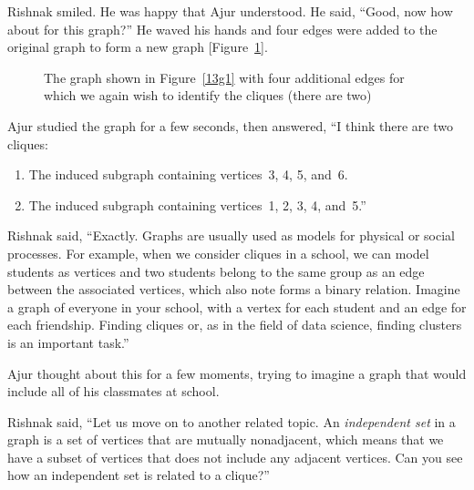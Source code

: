 Rishnak smiled. He was happy that Ajur understood. He said, ``Good, now how about for this graph?'' He waved his hands and four edges were added to the original graph to form a new graph [Figure~\ref{13g21}].

\begin{figure}
\begin{center}
\caption{The graph shown in Figure~\ref{13g1} with four additional edges for which we again wish to identify the cliques (there are two)}\label{13g21}
\end{center}
\end{figure}

Ajur studied the graph for a few seconds, then answered, ``I think there are two cliques:
\begin{enumerate}
    \item The induced subgraph containing vertices~3, 4, 5, and~6.
    \item The induced subgraph containing vertices~1, 2, 3, 4, and~5.''
\end{enumerate}

Rishnak said, ``Exactly. Graphs are usually used as models for physical or social processes. For example, when we consider cliques in a school, we can model students as vertices and two students belong to the same group as an edge between the associated vertices, which also note forms a binary relation. Imagine a graph of everyone in your school, with a vertex for each student and an edge for each friendship.  Finding cliques or, as in the field of data science, finding clusters is an important task.'' 

Ajur thought about this for a few moments, trying to imagine a graph that would include all of his classmates at school.

Rishnak said, ``Let us move on to another related topic. An \textit{independent set} in a graph is a set of vertices that are mutually nonadjacent, which means that we have a subset of vertices that does not include any adjacent vertices. Can you see how an independent set is related to a clique?'' 

